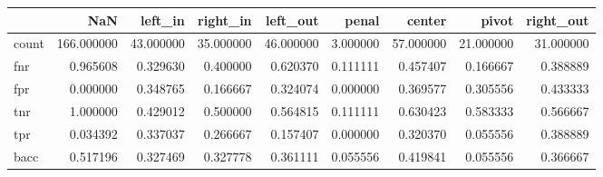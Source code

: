 \begin{tabular}{lrrrrrrrr}
\toprule
{} &         NaN &    left\_in &   right\_in &   left\_out &     penal &     center &      pivot &  right\_out \\
\midrule
count &  166.000000 &  43.000000 &  35.000000 &  46.000000 &  3.000000 &  57.000000 &  21.000000 &  31.000000 \\
fnr   &    0.965608 &   0.329630 &   0.400000 &   0.620370 &  0.111111 &   0.457407 &   0.166667 &   0.388889 \\
fpr   &    0.000000 &   0.348765 &   0.166667 &   0.324074 &  0.000000 &   0.369577 &   0.305556 &   0.433333 \\
tnr   &    1.000000 &   0.429012 &   0.500000 &   0.564815 &  0.111111 &   0.630423 &   0.583333 &   0.566667 \\
tpr   &    0.034392 &   0.337037 &   0.266667 &   0.157407 &  0.000000 &   0.320370 &   0.055556 &   0.388889 \\
bacc  &    0.517196 &   0.327469 &   0.327778 &   0.361111 &  0.055556 &   0.419841 &   0.055556 &   0.366667 \\
\bottomrule
\end{tabular}
